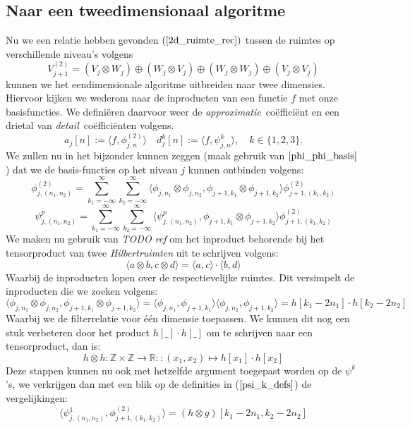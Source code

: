 \documentclass[11pt]{report}
\newcommand{\R}{\mathbb{R}}
\newcommand{\Z}{\mathbb{Z}}
\theoremstyle{plain}
\theoremstyle{remark}
\newcommand{\inpr}[2]{\langle #1 , #2 \rangle}
\begin{document}
\subsection{Naar een tweedimensionaal algoritme}
Nu we een relatie hebben gevonden $(\ref{2d_ruimte_rec})$ tussen de ruimtes op verschillende
niveau's volgens
\[
V_{j+1}^{(2)} = (V_j\otimes W_j) \oplus (W_j\otimes V_j) \oplus
(W_j\otimes W_j) \oplus (V_j\otimes V_j)
\] 
kunnen we het eendimensionale algoritme uitbreiden naar twee dimensies.
Hiervoor kijken we wederom naar de inproducten van een functie $f$ met
onze basisfuncties.
We defini\"eren daarvoor weer de \emph{approximatie}~co\"effici\"ent en een drietal
van \emph{detail}~co\"effici\"enten volgens.
\[
	a_j[n] := \langle f, \phi^{(2)}_{j,n} \rangle \quad d^k_j[n] := \langle f, \psi^k_{j,n} \rangle ,\quad k \in \{1,2,3\}.
\]
We zullen nu in het bijzonder kunnen zeggen (maak gebruik van $\ref{phi_phi_basis}$)
dat we de basis-functies op het niveau $j$ kunnen ontbinden volgens:
\begin{equation}
\label{phi_phi_som}
\phi^{(2)}_{j,(n_1,n_2)} = \sum_{k_1=-\infty}^\infty \sum_{k_2=-\infty}^\infty
\inpr{\phi_{j,n_1}\otimes\phi_{j,n_2}}{\phi_{j+1,k_1}\otimes\phi_{j+1,k_2}} 
\phi^{(2)}_{j+1,(k_1,k_2)}
\end{equation}
\begin{equation}
\label{psi_k_som}
\psi^{p}_{j,(n_1,n_2)} = \sum_{k_1=-\infty}^\infty \sum_{k_2=-\infty}^\infty
\inpr{\psi^p_{j,(n_1,n_2)}}{\phi_{j+1,k_1}\otimes\phi_{j+1,k_2}} 
\phi^{(2)}_{j+1,(k_1,k_2)}
\end{equation}
We maken nu gebruik van \emph{TODO ref} om het inproduct behorende bij het tensorproduct
van twee \emph{Hilbertruimten} uit te schrijven volgens:
\[
\inpr{a\otimes b}{c\otimes d} = \inpr{a}{c}\cdot \inpr{b}{d}
\]
Waarbij de inproducten lopen over de respectievelijke ruimtes.
Dit versimpelt de inproducten die we zoeken volgens:
\[
\inpr{\phi_{j,n_1}\otimes\phi_{j,n_2}}{\phi_{j+1,k_1}\otimes\phi_{j+1,k_2}}
=\inpr{\phi_{j,n_1}}{\phi_{j+1,k_1}}\inpr{\phi_{j,n_2}}{\phi_{j+1,k_2}}
=h[k_1-2n_1]\cdot h[k_2-2n_2]
\]
Waarbij we de filterrelatie voor \'e\'en dimensie toepassen. We kunnen dit nog een
stuk verbeteren door het product $h[\_]\cdot h[\_]$ om te schrijven naar een tensorproduct,
dan is:
\[
h\otimes h : \Z\times\Z \to \R :: (x_1,x_2) \mapsto h[x_1]\cdot h[x_2]
\]
Deze stappen kunnen nu ook met hetzelfde argument toegepast worden op de $\psi^k$'s,
we verkrijgen dan met een blik op de definities in ($\ref{psi_k_defs}$) de vergelijkingen:
\[
\inpr{\psi^1_{j,(n_1,n_2)}}{\phi^{(2)}_{j+1,(k_1,k_2)}} = (h\otimes g) [k_1-2n_1,k_2-2n_2]
\]
\end{document}
